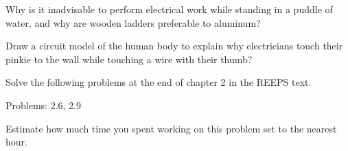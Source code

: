 \documentclass{article}
\begin{document}
\subproblem
Why is it inadvisable to perform electrical work while standing
in a puddle of water, and why are wooden ladders preferable to
aluminum?

\subproblem
Draw a circuit model of the human body to explain why electricians touch
their pinkie to the wall while touching a wire with their thumb?

%
%
%
%
%
%
%
%
%
%
%



Solve the following problems at the end of chapter 2 in the REEPS text.

Problems:  2.6, 2.9


Estimate how much time you spent working on this problem set to the
nearest hour.
\end{document}
